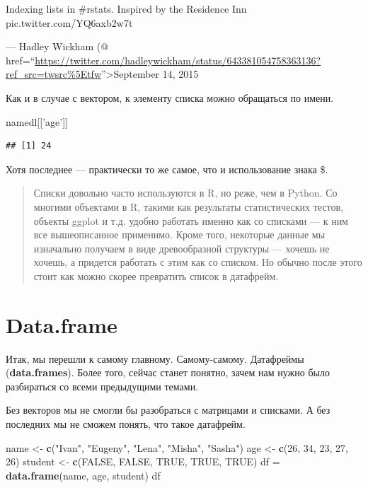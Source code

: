 \documentclass[]{book}
\newenvironment{Shaded}{\begin{snugshade}}{\end{snugshade}}
\newcommand{\DecValTok}[1]{\textcolor[rgb]{0.00,0.00,0.81}{#1}}
\newcommand{\KeywordTok}[1]{\textcolor[rgb]{0.13,0.29,0.53}{\textbf{#1}}}
\newcommand{\NormalTok}[1]{#1}
\newcommand{\OtherTok}[1]{\textcolor[rgb]{0.56,0.35,0.01}{#1}}
\newcommand{\StringTok}[1]{\textcolor[rgb]{0.31,0.60,0.02}{#1}}
\begin{document}
Indexing lists in \#rstats. Inspired by the Residence Inn pic.twitter.com/YQ6axb2w7t

--- Hadley Wickham (@ href=``\url{https://twitter.com/hadleywickham/status/643381054758363136?ref_src=twsrc\%5Etfw}''\textgreater September 14, 2015

Как и в случае с вектором, к элементу списка можно обращаться по имени.

\begin{Shaded}
\begin{Highlighting}[]
\NormalTok{namedl[[}\StringTok{'age'}\NormalTok{]]}
\end{Highlighting}
\end{Shaded}

\begin{verbatim}
## [1] 24
\end{verbatim}

Хотя последнее --- практически то же самое, что и использование знака \$.

\begin{quote}
Списки довольно часто используются в R, но реже, чем в Python. Со многими объектами в R, такими как результаты статистических тестов, объекты ggplot и т.д. удобно работать именно как со списками --- к ним все вышеописанное применимо. Кроме того, некоторые данные мы изначально получаем в виде древообразной структуры --- хочешь не хочешь, а придется работать с этим как со списком. Но обычно после этого стоит как можно скорее превратить список в датафрейм.
\end{quote}

\hypertarget{df}{%
\section{Data.frame}\label{df}}

Итак, мы перешли к самому главному. Самому-самому. Датафреймы (\textbf{data.frames}). Более того, сейчас станет понятно, зачем нам нужно было разбираться со всеми предыдущими темами.

Без векторов мы не смогли бы разобраться с матрицами и списками. А без последних мы не сможем понять, что такое датафрейм.

\begin{Shaded}
\begin{Highlighting}[]
\NormalTok{name <-}\StringTok{ }\KeywordTok{c}\NormalTok{(}\StringTok{"Ivan"}\NormalTok{, }\StringTok{"Eugeny"}\NormalTok{, }\StringTok{"Lena"}\NormalTok{, }\StringTok{"Misha"}\NormalTok{, }\StringTok{"Sasha"}\NormalTok{) }
\NormalTok{age <-}\StringTok{ }\KeywordTok{c}\NormalTok{(}\DecValTok{26}\NormalTok{, }\DecValTok{34}\NormalTok{, }\DecValTok{23}\NormalTok{, }\DecValTok{27}\NormalTok{, }\DecValTok{26}\NormalTok{) }
\NormalTok{student <-}\StringTok{ }\KeywordTok{c}\NormalTok{(}\OtherTok{FALSE}\NormalTok{, }\OtherTok{FALSE}\NormalTok{, }\OtherTok{TRUE}\NormalTok{, }\OtherTok{TRUE}\NormalTok{, }\OtherTok{TRUE}\NormalTok{) }
\NormalTok{df =}\StringTok{ }\KeywordTok{data.frame}\NormalTok{(name, age, student)  }
\NormalTok{df}
\end{Highlighting}
\end{Shaded}
\end{document}
